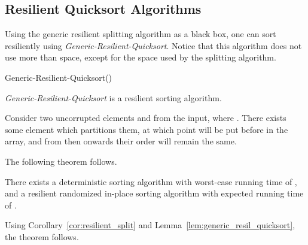 \documentclass{llncs}
\begin{document}
\subsection{Resilient Quicksort Algorithms}
Using the generic resilient splitting algorithm as a black box, one can sort resiliently using \emph{Generic-Resilient-Quicksort}. Notice that this algorithm does not use more than  space, except for the space used by the splitting algorithm.\\


\begin{algorithm}[H]
\label{alg:Resil_quicksort}

\caption{Generic-Resilient-Quicksort()}
\end{algorithm}


\begin{lemma}\label{lem:generic_resil_quicksort}
\emph{Generic-Resilient-Quicksort} is a resilient sorting algorithm.
\end{lemma}

\begin{pf}
Consider two uncorrupted elements  and  from the input, where . There exists some element  which partitions them, at which point  will be put before  in the array, and from then onwards their order will remain the same.
\end{pf}


The following theorem follows.

\begin{theorem}
There exists a deterministic sorting algorithm with worst-case running time of , and a resilient randomized in-place sorting algorithm with expected running time of .
\end{theorem}

\begin{pf}
Using Corollary~\ref{cor:resilient_split} and Lemma~\ref{lem:generic_resil_quicksort}, the theorem follows.
\end{pf}















\newpage



\end{document}
